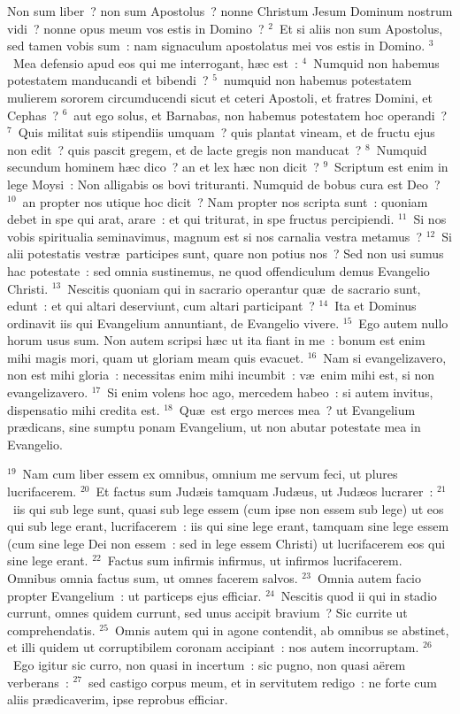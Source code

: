 \lettrine[lines=3,image=true,loversize=0.05,lraise=-0.03]{N}{}on sum liber~? non sum Apostolus~? nonne Christum Jesum Dominum nostrum vidi~? nonne opus meum vos estis in Domino~?
${}^{2}$~Et si aliis non sum Apostolus, sed tamen vobis sum~: nam signaculum apostolatus mei vos estis in Domino.
${}^{3}$~Mea defensio apud eos qui me interrogant, h\ae c est~:
${}^{4}$~Numquid non habemus potestatem manducandi et bibendi~?
${}^{5}$~numquid non habemus potestatem mulierem sororem circumducendi sicut et ceteri Apostoli, et fratres Domini, et Cephas~?
${}^{6}$~aut ego solus, et Barnabas, non habemus potestatem hoc operandi~?
${}^{7}$~Quis militat suis stipendiis umquam~? quis plantat vineam, et de fructu ejus non edit~? quis pascit gregem, et de lacte gregis non manducat~?
${}^{8}$~Numquid secundum hominem h\ae c dico~? an et lex h\ae c non dicit~?
${}^{9}$~Scriptum est enim in lege Moysi~: Non alligabis os bovi trituranti. Numquid de bobus cura est Deo~?
${}^{10}$~an propter nos utique hoc dicit~? Nam propter nos scripta sunt~: quoniam debet in spe qui arat, arare~: et qui triturat, in spe fructus percipiendi.
${}^{11}$~Si nos vobis spiritualia seminavimus, magnum est si nos carnalia vestra metamus~?
${}^{12}$~Si alii potestatis vestr\ae\ participes sunt, quare non potius nos~? Sed non usi sumus hac potestate~: sed omnia sustinemus, ne quod offendiculum demus Evangelio Christi.
${}^{13}$~Nescitis quoniam qui in sacrario operantur qu\ae\ de sacrario sunt, edunt~: et qui altari deserviunt, cum altari participant~?
${}^{14}$~Ita et Dominus ordinavit iis qui Evangelium annuntiant, de Evangelio vivere.
${}^{15}$~Ego autem nullo horum usus sum. Non autem scripsi h\ae c ut ita fiant in me~: bonum est enim mihi magis mori, quam ut gloriam meam quis evacuet.
${}^{16}$~Nam si evangelizavero, non est mihi gloria~: necessitas enim mihi incumbit~: v\ae\ enim mihi est, si non evangelizavero.
${}^{17}$~Si enim volens hoc ago, mercedem habeo~: si autem invitus, dispensatio mihi credita est.
${}^{18}$~Qu\ae\ est ergo merces mea~? ut Evangelium pr\ae dicans, sine sumptu ponam Evangelium, ut non abutar potestate mea in Evangelio.


${}^{19}$~Nam cum liber essem ex omnibus, omnium me servum feci, ut plures lucrifacerem.
${}^{20}$~Et factus sum Jud\ae is tamquam Jud\ae us, ut Jud\ae os lucrarer~:
${}^{21}$~iis qui sub lege sunt, quasi sub lege essem (cum ipse non essem sub lege) ut eos qui sub lege erant, lucrifacerem~: iis qui sine lege erant, tamquam sine lege essem (cum sine lege Dei non essem~: sed in lege essem Christi) ut lucrifacerem eos qui sine lege erant.
${}^{22}$~Factus sum infirmis infirmus, ut infirmos lucrifacerem. Omnibus omnia factus sum, ut omnes facerem salvos.
${}^{23}$~Omnia autem facio propter Evangelium~: ut particeps ejus efficiar.
${}^{24}$~Nescitis quod ii qui in stadio currunt, omnes quidem currunt, sed unus accipit bravium~? Sic currite ut comprehendatis.
${}^{25}$~Omnis autem qui in agone contendit, ab omnibus se abstinet, et illi quidem ut corruptibilem coronam accipiant~: nos autem incorruptam.
${}^{26}$~Ego igitur sic curro, non quasi in incertum~: sic pugno, non quasi a\"erem verberans~:
${}^{27}$~sed castigo corpus meum, et in servitutem redigo~: ne forte cum aliis pr\ae dicaverim, ipse reprobus efficiar.

